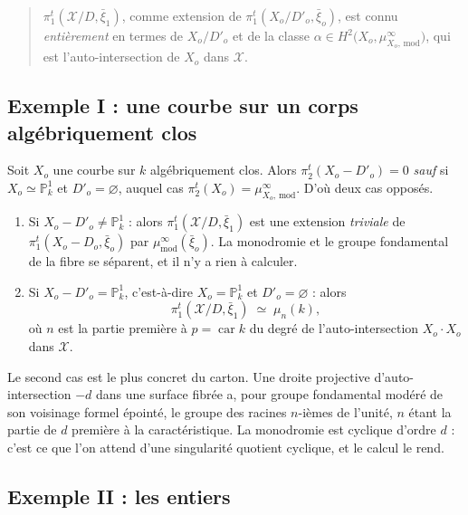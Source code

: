 \documentclass[11pt,a4paper]{article}
\begin{document}
\begin{quote}
$\pi_{1}^{t}(\mathcal{X}/D, \bar{\xi}_{1})$, comme extension de
$\pi_{1}^{t}(X_{o}/D'_{o}, \bar{\xi}_{o})$, est connu \emph{entièrement} en
termes de $X_{o}/D'_{o}$ et de la classe
$\alpha \in H^{2}\bigl(X_{o}, \mu^{\infty}_{X_{o},\,\mathrm{mod}}\bigr)$,
qui est l'auto-intersection de $X_{o}$ dans $\mathcal{X}$.
\end{quote}

\subsection*{Exemple I : une courbe sur un corps algébriquement clos}

Soit $X_{o}$ une courbe sur $k$ algébriquement clos. Alors
$\pi_{2}^{t}(X_{o} - D'_{o}) = 0$ \emph{sauf} si $X_{o} \simeq
\mathbb{P}^{1}_{k}$ et $D'_{o} = \varnothing$, auquel cas
$\pi_{2}^{t}(X_{o}) = \mu^{\infty}_{X_{o},\,\mathrm{mod}}$. D'où deux cas
opposés.

\begin{enumerate}
  \item[1)] Si $X_{o} - D'_{o} \neq \mathbb{P}^{1}_{k}$ : alors
    $\pi_{1}^{t}(\mathcal{X}/D, \bar{\xi}_{1})$ est une extension
    \emph{triviale} de $\pi_{1}^{t}(X_{o} - D_{o}, \bar{\xi}_{o})$ par
    $\mu^{\infty}_{\mathrm{mod}}(\bar{\xi}_{o})$. La monodromie et le groupe
    fondamental de la fibre se séparent, et il n'y a rien à calculer.
  \item[2)] Si $X_{o} - D'_{o} = \mathbb{P}^{1}_{k}$, c'est-à-dire
    $X_{o} = \mathbb{P}^{1}_{k}$ et $D'_{o} = \varnothing$ : alors
    \[
      \pi_{1}^{t}(\mathcal{X}/D, \bar{\xi}_{1}) \;\simeq\; \mu_{n}(k) ,
    \]
    où $n$ est la partie première à $p = \operatorname{car} k$ du degré de
    l'auto-intersection $X_{o} \cdot X_{o}$ dans $\mathcal{X}$.
\end{enumerate}

Le second cas est le plus concret du carton.
Une droite projective d'auto-intersection $-d$ dans une surface fibrée a, pour
groupe fondamental modéré de son voisinage formel épointé, le groupe des
racines $n$-ièmes de l'unité, $n$ étant la partie de $d$ première à la
caractéristique. La monodromie est cyclique d'ordre $d$ : c'est ce que l'on
attend d'une singularité quotient cyclique, et le calcul le rend.

\subsection*{Exemple II : les entiers}
\end{document}
